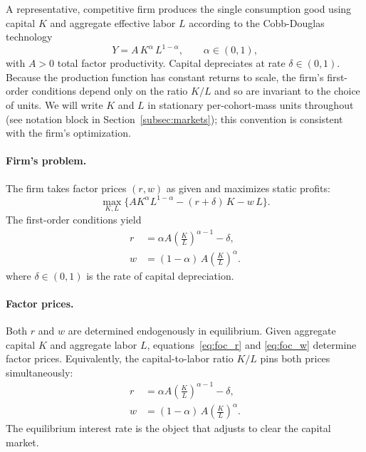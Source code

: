 \documentclass[12pt,a4paper]{article}
\begin{document}
A representative, competitive firm produces the single consumption good using capital $K$ and aggregate effective labor $L$ according to the Cobb-Douglas technology
\begin{equation}
\label{eq:production}
Y = A\, K^\alpha\, L^{1-\alpha}, \qquad \alpha \in (0,1),
\end{equation}
with $A > 0$ total factor productivity. Capital depreciates at rate $\delta \in (0,1)$. Because the production function has constant returns to scale, the firm's first-order conditions depend only on the ratio $K/L$ and so are invariant to the choice of units. We will write $K$ and $L$ in stationary per-cohort-mass units throughout (see notation block in Section~\ref{subsec:markets}); this convention is consistent with the firm's optimization.
 
\paragraph{Firm's problem.}
The firm takes factor prices $(r, w)$ as given and maximizes static profits:
\begin{equation}
\label{eq:firm_problem}
\max_{K, L} \bigl\{A K^\alpha L^{1-\alpha} - (r+\delta)\,K - w\,L\bigr\}.
\end{equation}
The first-order conditions yield
\begin{align}
r &= \alpha A \left(\frac{K}{L}\right)^{\alpha-1} - \delta, \label{eq:foc_r} \\
w &= (1-\alpha)\, A \left(\frac{K}{L}\right)^{\alpha}. \label{eq:foc_w}
\end{align}
where $\delta \in (0,1)$ is the rate of capital depreciation.

\paragraph{Factor prices.}
Both $r$ and $w$ are determined endogenously in equilibrium. Given aggregate capital $K$ and aggregate labor $L$, equations~\eqref{eq:foc_r} and \eqref{eq:foc_w} determine factor prices. Equivalently, the capital-to-labor ratio $K/L$ pins both prices simultaneously:
\begin{align}
r &= \alpha A \left(\frac{K}{L}\right)^{\alpha - 1} - \delta, \label{eq:interest_rate} \\
w &= (1-\alpha)\, A \left(\frac{K}{L}\right)^{\alpha}. \label{eq:wage}
\end{align}
The equilibrium interest rate is the object that adjusts to clear the capital market.
\end{document}
